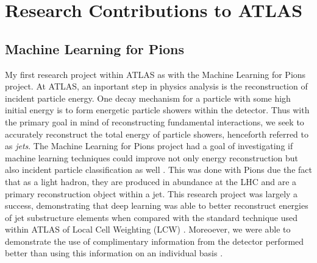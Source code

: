 \documentclass[12pt]{article}
\begin{document}
\section{Research Contributions to ATLAS}



\subsection{Machine Learning for Pions}
My first research project within ATLAS as with the Machine Learning for Pions
project. At ATLAS, an inportant step in physics analysis is the reconstruction
of incident particle energy. One decay mechanism for a particle with some high
initial energy is to form energetic particle showers within the detector. Thus
with the primary goal in mind of reconstructing fundamental interactions, we
seek to accurately reconstruct the total energy of particle showers, henceforth
referred to as \textit{jets}. The Machine Learning for Pions project had a goal
of investigating if machine learning techniques could improve not only energy
reconstruction but also incident particle classification as well
\cite{ml4p_prelim}. This was done with Pions due the fact that as a light
hadron, they are produced in abundance at the LHC and are a primary
reconstruction object within a jet. This research project was largely a success,
demonstrating that deep learning was able to better reconstruct energies of jet
substructure elements when compared with the standard technique used within
ATLAS of Local Cell Weighting (LCW) \cite{ml4p}. Moreoever, we were able to
demonstrate the use of complimentary information from the detector performed
better than using this information on an individual basis \cite{ml4p}.
\end{document}
